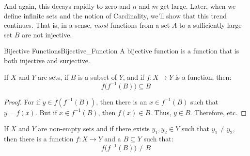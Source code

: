     And again, this decays rapidly to zero and $n$ and $m$
    get large. Later, when we define infinite sets
    and the notion of Cardinality, we'll show that this
    trend continues. That is, in a sense, \textit{most}
    functions from a set $A$ to a sufficiently large set
    $B$ are not injective.
    \begin{ldefinition}{Bijective Functions}{Bijective_Function}
        A \gls{bijective function} is a function
        that is both injective and surjective.
    \end{ldefinition}
    \begin{theorem}
        If $X$ and $Y$ are sets, if $B$ is a subset of $Y$,
        and if $f:X\rightarrow{Y}$ is a function, then:
        \begin{equation}
            f\big(f^{-1}(B)\big)\subseteq{B}
        \end{equation}
    \end{theorem}
    \begin{proof}
        For if $y\in{f(f^{-1}(B))}$, then there is an
        $x\in{f^{-1}(B)}$ such that $y=f(x)$. But if
        $x\in{f^{-1}(B)}$, then $f(x)\in{B}$. Thus,
        $y\in{B}$. Therefore, etc.
    \end{proof}
    \begin{theorem}
        If $X$ and $Y$ are non-empty sets and if there exists
        $y_{1},y_{2}\in{Y}$ such that $y_{1}\ne{y}_{2}$, then
        there is a function $f:X\rightarrow{Y}$ and a
        $B\subseteq{Y}$ such that:
        \begin{equation}
            f\big(f^{-1}(B)\big)\ne{B}
        \end{equation}
    \end{theorem}
